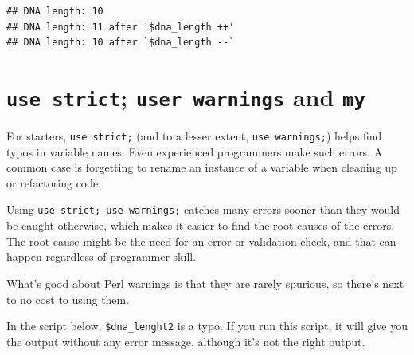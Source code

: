 \documentclass[]{book}
\begin{document}
\begin{verbatim}
## DNA length: 10
## DNA length: 11 after '$dna_length ++'
## DNA length: 10 after `$dna_length --`
\end{verbatim}

\hypertarget{use-strict-user-warnings-and-my}{%
\section{\texorpdfstring{\texttt{use\ strict}; \texttt{user\ warnings} and \texttt{my}}{use strict; user warnings and my}}\label{use-strict-user-warnings-and-my}}

For starters, \texttt{use\ strict;} (and to a lesser extent, \texttt{use\ warnings;}) helps find typos in variable names. Even experienced programmers make such errors. A common case is forgetting to rename an instance of a variable when cleaning up or refactoring code.

Using \texttt{use\ strict;\ use\ warnings;} catches many errors sooner than they would be caught otherwise, which makes it easier to find the root causes of the errors. The root cause might be the need for an error or validation check, and that can happen regardless of programmer skill.

What's good about Perl warnings is that they are rarely spurious, so there's next to no cost to using them.

In the script below, \texttt{\$dna\_lenght2} is a typo. If you run this script, it will give you the output without any error message, although it's not the right output.
\end{document}
